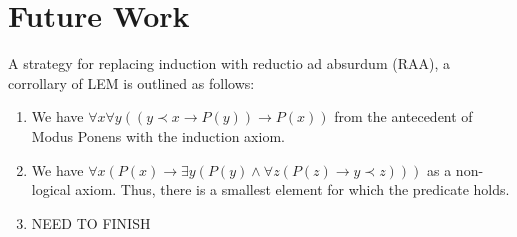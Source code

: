\documentclass{article}
\begin{document}
\section{Future Work}
A strategy for replacing induction with reductio ad absurdum (RAA), a corrollary of LEM is outlined as follows: 
\begin{enumerate}
\item We have $\forall x \forall y ((y \prec x \to P(y)) \to P(x))$ from the antecedent of Modus Ponens with the induction axiom.
\item We have $\forall x (P(x) \to \exists y (P(y) \wedge \forall z (P(z) \to y \prec z))) $ as a non-logical axiom. Thus, there is a smallest element for which the predicate holds.
\item NEED TO FINISH
\end{enumerate}
\end{document}
